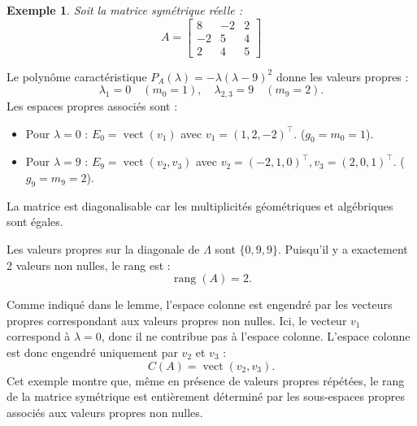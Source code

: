 \documentclass[12pt]{report}
\newtheorem{example}{Exemple}
\begin{document}
\clearpage
\begin{example}
    Soit la matrice symétrique réelle :
    \[
        A = \begin{bmatrix}
            8  & -2 & 2 \\
            -2 & 5  & 4 \\
            2  & 4  & 5
        \end{bmatrix}
    \]
\end{example}
\noindent Le polynôme caractéristique $P_A(\lambda) = -\lambda(\lambda - 9)^2$ donne les valeurs propres :
\[
    \lambda_1 = 0 \quad (m_0 = 1), \quad \lambda_{2,3} = 9 \quad (m_9 = 2).
\]
Les espaces propres associés sont :
\begin{itemize}
    \item Pour $\lambda = 0$ : $E_0 = \operatorname{vect}(v_1)$ avec $v_1 = (1, 2, -2)^\top$. ($g_0 = m_0 = 1$).
    \item Pour $\lambda = 9$ : $E_9 = \operatorname{vect}(v_2, v_3)$ avec $v_2 = (-2, 1, 0)^\top, v_3 = (2, 0, 1)^\top$. ($g_9 = m_9 = 2$).
\end{itemize}
La matrice est diagonalisable car les multiplicités géométriques et algébriques sont égales.

\noindent Les valeurs propres sur la diagonale de $\Lambda$ sont $\{0, 9, 9\}$. Puisqu'il y a exactement 2 valeurs non nulles, le rang est :
\[
    \operatorname{rang}(A) = 2.
\]

\noindent Comme indiqué dans le lemme, l'espace colonne est engendré par les vecteurs propres correspondant aux valeurs propres non nulles.
Ici, le vecteur $v_1$ correspond à $\lambda=0$, donc il ne contribue pas à l'espace colonne.
L'espace colonne est donc engendré uniquement par $v_2$ et $v_3$ :
\[
    C(A) = \operatorname{vect}(v_2, v_3).
\]
Cet exemple montre que, même en présence de valeurs propres répétées, le rang de la matrice symétrique est entièrement déterminé par les sous-espaces propres associés aux valeurs propres non nulles.
\hfill \cite{utexas_svd}
\end{document}
